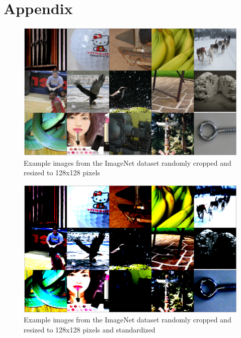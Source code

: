 \documentclass[10pt,a4paper,twoside]{article}
\begin{document}
\section{Appendix}
\begin{figure}
    \centering
    \includegraphics[width=\textwidth]{../../sample_images/imagenet_unnormalized.png}
    \caption{Example images from the ImageNet dataset randomly cropped and resized to 128x128 pixels}
    \label{fig:imnet_example}
\end{figure}
\begin{figure}
    \centering
    \includegraphics[width=\textwidth]{../../sample_images/imagenet_normalized.png}
    \caption{Example images from the ImageNet dataset randomly cropped and resized to 128x128 pixels and standardized}
    \label{fig:imnet_example_normalized}
\end{figure}
\end{document}
